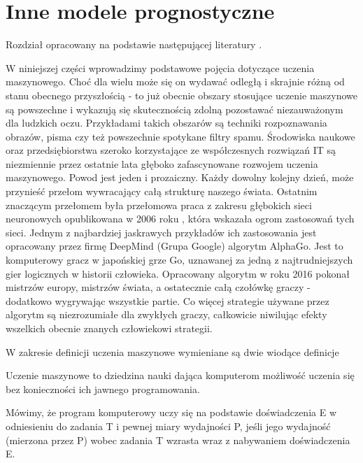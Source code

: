 \documentclass[10pt,a4paper]{book}
\begin{document}
\chapter{Inne modele prognostyczne}

Rozdział opracowany na podstawie następującej literatury \citep{geron2018uczenie}.

W niniejszej części wprowadzimy podstawowe pojęcia dotyczące uczenia maszynowego. Choć dla wielu może się on wydawać odległą i skrajnie różną od stanu obecnego przyszłością - to już obecnie obszary stosujące uczenie maszynowe są powszechne i wykazują się skutecznością zdolną pozostawać niezauważonym dla ludzkich oczu. Przykładami takich obszarów są techniki rozpoznawania obrazów, pisma czy też powszechnie spotykane filtry spamu. Środowiska naukowe oraz przedsiębiorstwa szeroko korzystające ze współczesnych rozwiązań IT są niezmiennie przez ostatnie lata głęboko zafascynowane rozwojem uczenia maszynowego. Powod jest jeden i prozaiczny. Każdy dowolny kolejny dzień, może przynieść przełom wywracający całą strukturę naszego świata. Ostatnim znaczącym przełomem była przełomowa praca z zakresu głębokich sieci neuronowych opublikowana w 2006 roku \cite{hinton2006fast}, która wskazała ogrom zastosowań tych sieci. Jednym z najbardziej jaskrawych przykładów ich zastosowania jest opracowany przez firmę DeepMind (Grupa Google) algorytm AlphaGo. Jest to komputerowy gracz w japońskiej grze Go, uznawanej za jedną z najtrudniejszych gier logicznych w historii człowieka. Opracowany algorytm w roku 2016 pokonał mistrzów europy, mistrzów świata, a ostatecznie całą czołówkę graczy - dodatkowo wygrywając wszystkie partie. Co więcej strategie używane przez algorytm są niezrozumiałe dla zwykłych graczy, całkowicie niwilując efekty wszelkich obecnie znanych człowiekowi strategii. 

W zakresie definicji uczenia maszynowe wymieniane są dwie wiodące definicje

\begin{definition}
Uczenie maszynowe to dziedzina nauki dająca komputerom możliwość uczenia się bez konieczności ich jawnego programowania. 
\end{definition}

\begin{definition}
Mówimy, że program komputerowy uczy się na podstawie doświadczenia E w odniesieniu do zadania T i pewnej miary wydajności P, jeśli jego wydajność (mierzona przez P) wobec zadania T wzrasta wraz z nabywaniem doświadczenia E.
\end{definition}
\end{document}
